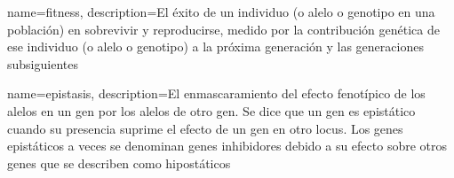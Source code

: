 {
	name=fitness,
	description={El éxito de un individuo (o alelo o genotipo en una población) en sobrevivir y reproducirse, medido por la contribución genética de ese individuo (o alelo o genotipo) a la próxima generación y las generaciones subsiguientes}
}

{
	name=epistasis,
	description={El enmascaramiento del efecto fenotípico de los alelos en un gen por los alelos de otro gen. Se dice que un gen es epistático cuando su presencia suprime el efecto de un gen en otro locus. Los genes epistáticos a veces se denominan genes inhibidores debido a su efecto sobre otros genes que se describen como hipostáticos}
}

